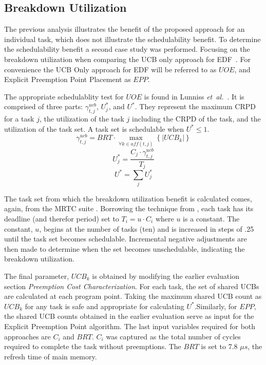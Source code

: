 \subsection{Breakdown Utilization}

The previous analysis illustrates the benefit of the proposed
approach for an individual task, which does not illustrate the
schedulability benefit. To determine the schedulability benefit a
second case study was performed. Focusing on the breakdown utilization
when comparing the UCB only approach for EDF~\cite{lunniss:13}. For
convenience the UCB Only approach for EDF will be referred to as
${UOE}$, and Explicit Preemption Point Placement as ${EPP}$.

The appropriate schedulablity test for ${UOE}$ is found in
Lunniss \emph{et~al.}~\cite{lunniss:13}. It is comprised of three
parts: ${\gamma^{ucb}_{t,j}}$, ${U^*_j}$, and ${U^*}$. They represent
the maximum CRPD for a task ${j}$, the utilization of the task ${j}$
including the CRPD of the task, and the utilization of the task set.
A task set is schedulable when ${U^* \le 1}$.
\begin{equation}
  \gamma^{ucb}_{t,j} = BRT \cdot \max\limits_{\forall k \in aff(t,j)}
  \left\{ \left| UCB_k \right| \right\}
\end{equation}
\begin{equation}
  U^*_j = \frac{C_j \cdot \gamma^{ucb}_{t,j}}{T_j}
\end{equation}
\begin{equation}
  U^* = \sum_j U^*_j
\end{equation}

The task set from which the breakdown utilization benefit is
calculated comes, again, from the MRTC suite \cite{mrtc:01}. Borrowing
the technique from \cite{lunniss:13}, each task has its deadline (and
therefor period) set to ${T_i = u \cdot C_i}$
where ${u}$ is a constant. The constant, ${u}$, begins at the number
of tasks (ten) and is increased in steps of .25 until the task set
becomes schedulable. Incremental negative adjustments are then made to
determine when the set becomes unschedulable, indicating the breakdown
utilization.

The final parameter, ${UCB_k}$ is obtained by modifying the earlier
evaluation section \emph{Preemption Cost Characterization}. For each
task, the set of shared UCBs are calculated at each program
point. Taking the maximum shared UCB count as ${UCB_k}$ for any task
is safe and appropriate for calculating ${U^*}$.Similarly, for ${EPP}$,
the shared UCB counts obtained in the earlier evaluation serve as input for
the Explicit Preemption Point algorithm.  The last input variables required
for both approaches are ${C_i}$ and ${BRT}$. ${C_i}$ was captured as the
total number of cycles required to complete the task without preemptions.
The ${BRT}$ is set to 7.8 ${{\mu}s}$, the refresh time of main memory.

